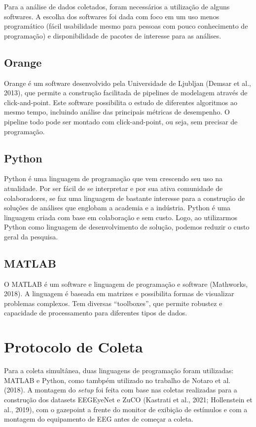 Para a análise de dados coletados, foram necessários a utilização de alguns
softwares. A escolha dos softwares foi dada com foco em um uso menos programático
(fácil usabilidade mesmo para pessoas com pouco conhecimento de programação) 
e disponibilidade de pacotes de interesse para as análises.

\subsection{Orange}
Orange é um software desenvolvido pela Universidade de Ljubljan (Demsar et
al., 2013), que permite a construção facilitada de pipelines de modelagem através de
click-and-point. Este software possibilita o estudo de diferentes algoritmos ao mesmo
tempo, incluindo análise das principais métricas de desempenho. O pipeline todo
pode ser montado com click-and-point, ou seja, sem precisar de programação.

\subsection{Python}
Python é uma linguagem de programação que vem crescendo seu uso na
atualidade. Por ser fácil de se interpretar e por sua ativa comunidade de
colaboradores, se faz uma linguagem de bastante interesse para a construção de
soluções de análises que englobam a academia e a indústria. Python é uma linguagem
criada com base em colaboração e sem custo. Logo, ao utilizarmos Python como
linguagem de desenvolvimento de solução, podemos reduzir o custo geral da
pesquisa.

\subsection{MATLAB}
O MATLAB é um software e linguagem de programação e software (Mathworks, 2018). A linguagem é baseada em matrizes e possibilita formas de visualizar
problemas complexos. Tem diversas “toolboxes”, que permite robustez e capacidade
de processamento para diferentes tipos de dados.

\section{Protocolo de Coleta}

Para a coleta simultânea, duas linguagens de programação foram utilizadas: MATLAB e Python, como tambpém 
utilizado no trabalho de Notaro et al. (2018).  
A montagem do \textit{setup} foi feita com base nas coletas realizadas para a construção dos datasets EEGEyeNet e 
ZuCO (Kastrati et al., 2021; Hollenstein et al., 2019), com o gazepoint a frente do monitor de exibição de estímulos
e com a montagem do equipamento de EEG antes de começar a coleta. 

